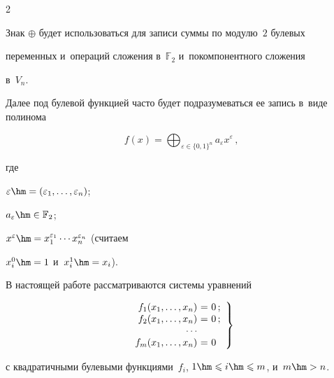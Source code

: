 \begin{multicols}{2}




Знак $\oplus$ будет использоваться для записи суммы по модулю~$2$ булевых 


переменных и~операций сложения в~$\mathbb{F}_2$ и~покомпонентного сложения 


в~$V_n$.





Далее под булевой функцией часто будет под\-разуме\-вать\-ся ее запись в~виде полинома


$$


f(x)=\bigoplus_{\varepsilon\in\{0,1\}^n} a_{\varepsilon}x^{\varepsilon}\,,


$$


где %


$\varepsilon\hm=(\varepsilon_1,\ldots,\varepsilon_n)$;


$a_{\varepsilon}\hm\in\mathbb{F}_2$; 


$x^{\varepsilon}\hm=x_1^{\varepsilon_1}\cdots x_n^{\varepsilon_n}$ (считаем 


$x_i^0\hm=1$ и~$x_i^1\hm=x_i$).








В настоящей работе рассматриваются системы уравнений


\begin{equation}


\label{system}


\left.


    \begin{array}{r@{\ }c@{\ }l}


        f_1(x_1,\ldots,x_n)&=&0\,;\\


        f_2(x_1,\ldots,x_n)&=&0\,;\\


        \cdots\\


        f_m(x_1,\ldots,x_n)&=&0\\


    \end{array}


  \right\}


\end{equation}


с квадратичными булевыми функциями~$f_i$, $1\hm\leqslant i\hm\leqslant m$, и~$m\hm>n$.



\end{multicols}

